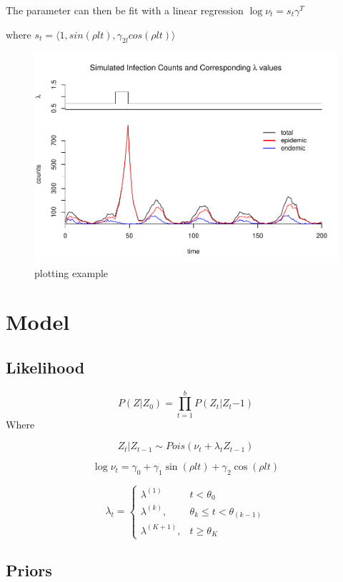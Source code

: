 \documentclass[]{article}
\numberwithin{equation}{section}
\begin{document}
The parameter can then be fit with a linear regression
\(\log{\nu_t} = s_t\gamma^T\)

where
\(s_t = \langle 1, sin(\rho l t), \gamma_{2l}cos(\rho l t) \rangle\)

\begin{figure}
\centering
\includegraphics{thesis_draft_files/figure-latex/simulation figure-1.pdf}
\caption{\label{fig:figs}plotting example}
\end{figure}

\hypertarget{model}{%
\section{Model}\label{model}}

\hypertarget{likelihood}{%
\subsection{Likelihood}\label{likelihood}}

\[P(Z|Z_0) = \prod_{t=1}^b P(Z_t|Z_t{-1})\] Where

\[Z_t|Z_{t-1} \sim Pois(\nu_t + \lambda_tZ_{t-1})\]

\[\log{\nu_t} = \gamma_0 +  \gamma_{1}\sin(\rho l t)+\gamma_{2}\cos(\rho l t)\]

\[ \lambda_t =  \begin{cases} \lambda^{(1)} & t < \theta_0 \\
\lambda^{(k)}, & \theta_{k} \leq t < \theta_{(k-1)} \\
\lambda^{(K+1)}, & t \geq \theta_K \end{cases}\]

\hypertarget{priors}{%
\subsection{Priors}\label{priors}}
\end{document}
